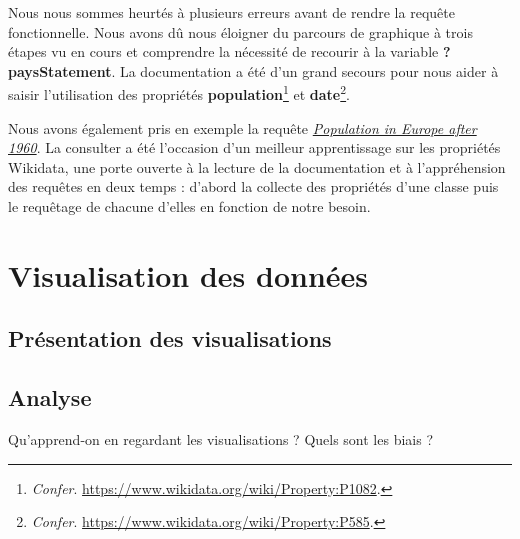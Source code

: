 \documentclass[hidelinks, 12pt]{article}
\begin{document}
			Nous nous sommes heurtés à plusieurs erreurs avant de rendre la requête fonctionnelle. Nous avons dû nous éloigner du parcours de graphique à trois étapes vu en cours et comprendre la nécessité de recourir à la variable \textbf{?paysStatement}. La documentation a été d'un grand secours pour nous aider à saisir l'utilisation des propriétés \textbf{population}\footnote{\emph{Confer}. \url{https://www.wikidata.org/wiki/Property:P1082}.} et \textbf{date}\footnote{\emph{Confer}. \url{https://www.wikidata.org/wiki/Property:P585}.}.
			
			Nous avons également pris en exemple la requête \href{https://query.wikidata.org/#%23Population%20in%20Europe%20after%201960%0ASELECT%20%20%3FobjectLabel%20%20%20%20%28YEAR%28%3Fdate%29%20as%20%3Fyear%29%0A%20%20%20%20%20%20%20%20%3Fpopulation%20%20%20%20%20%28%3FobjectLabel%20as%20%3FLocation%29%0AWHERE%0A%7B%0A%20%20%20%20%20%20%20%20wd%3AQ458%20wdt%3AP150%20%3Fobject%20.%20%20%20%23%20European%20Union%20%20contains%20administrative%20territorial%20entity%0A%20%20%20%20%20%20%20%20%3Fobject%20p%3AP1082%20%3FpopulationStatement%20.%0A%20%20%20%20%20%20%20%20%3FpopulationStatement%20%20%20%20ps%3AP1082%20%3Fpopulation%0A%20%20%20%20%20%20%20%20%3B%20pq%3AP585%20%3Fdate%20.%0A%20%20%20%20%20%20%20%20SERVICE%20wikibase%3Alabel%20%7B%20bd%3AserviceParam%20wikibase%3Alanguage%20%22%5BAUTO_LANGUAGE%5D%2Cen%22%20%7D%20%20%20%20%20%20%20%20%20%20%20%20%20%20%20%0A%20%20FILTER%20%28YEAR%28%3Fdate%29%20%3E%3D%201960%29%0A%7D%0AORDER%20BY%20%3FobjectLabel%20%3Fyear}{\emph{Population in Europe after 1960}}. La consulter a été l'occasion d'un meilleur apprentissage sur les propriétés Wikidata, une porte ouverte à la lecture de la documentation et à l'appréhension des requêtes en deux temps : d'abord la collecte des propriétés d'une classe puis le requêtage de chacune d'elles en fonction de notre besoin.

	\section{Visualisation des données}
	
		\subsection{Présentation des visualisations}
		
		\subsection{Analyse}
		
		Qu'apprend-on en regardant les visualisations ? Quels sont les biais ?
		\newpage

	\tableofcontents
\end{document}
